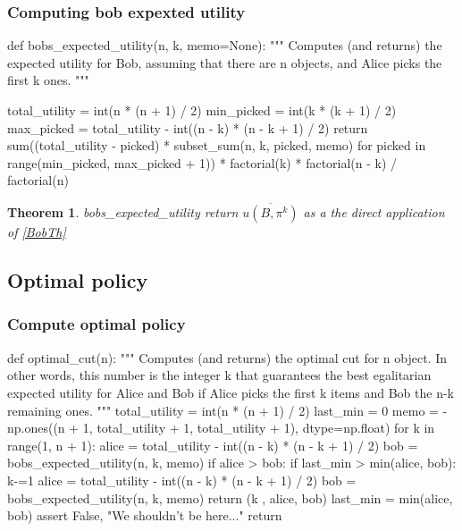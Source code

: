 \documentclass[a4paper, english, 10pt]{article}
\newtheorem{theorem}{Theorem}
\begin{document}
\subsubsection{Computing bob expexted utility}

	\begin{customFrame}
	def bobs_expected_utility(n, k, memo=None):
	"""
	Computes (and returns) the expected utility for Bob, assuming
	that there are n objects, and Alice picks the first k ones.
	"""
	
	total_utility = int(n * (n + 1) / 2)
	min_picked = int(k * (k + 1) / 2)
	max_picked = total_utility - int((n - k) * (n - k + 1) / 2)
	return sum((total_utility - picked) * subset_sum(n, k, picked, memo)
	for picked in range(min_picked, max_picked + 1)) * factorial(k) * factorial(n - k) / factorial(n)		
	\end{customFrame}
\label{BobComp}
\begin{theorem}
	bobs\_expected\_utility return $ \overline{u(B, \pi^k)} $ as a the direct application of \ref{BobTh}
\end{theorem}

\subsection{Optimal policy}

\subsubsection{Compute optimal policy}

	\begin{customFrame}
def optimal_cut(n):
"""
Computes (and returns) the optimal cut for n object. In other words,
this number is the integer k that guarantees the best egalitarian expected
utility for Alice and Bob if Alice picks the first k items and Bob the n-k
remaining ones.
"""
total_utility = int(n * (n + 1) / 2)
last_min = 0
memo = -np.ones((n + 1, total_utility + 1, total_utility + 1), dtype=np.float)
for k in range(1, n + 1):
alice = total_utility - int((n - k) * (n - k + 1) / 2)
bob = bobs_expected_utility(n, k, memo)
if alice > bob:
if last_min > min(alice, bob):
k-=1
alice = total_utility - int((n - k) * (n - k + 1) / 2)
bob = bobs_expected_utility(n, k, memo)
return (k , alice, bob)
last_min = min(alice, bob)
assert False, "We shouldn't be here..."
return
	
\end{customFrame}
\end{document}
